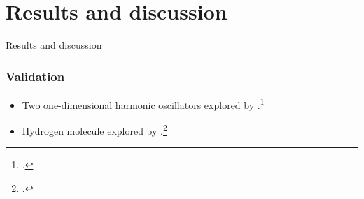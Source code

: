 \documentclass{beamer}
\begin{document}
%

\section{Results and discussion}

\begin{frame}[plain, c]
    \begin{center}
        \Huge Results and discussion
    \end{center}
\end{frame}

\begin{frame}
    \frametitle{Validation}
    \begin{itemize}
        \item Two one-dimensional harmonic oscillators explored by
            \citeauthor{zanghellini_2004}.\footcite{zanghellini_2004}
        \item Hydrogen molecule explored by
            \citeauthor{li_2005}.\footcite{li_2005}
    \end{itemize}
\end{frame}
\end{document}
